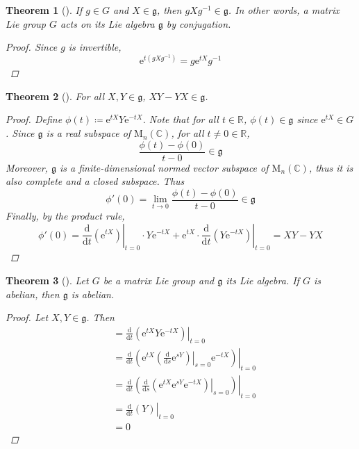 \documentclass[letterpaper, 10pt]{article}
\theoremstyle{theostyle}
\newtheorem{theorem}{Theorem}[section]
\newenvironment{thmstyle}[1][]{%
    \begin{theorem}[#1]\leavevmode\vspace{-\baselineskip}\myquote%
    }{\endmyquote\end{theorem}}
\begin{document}
\begin{thmstyle}
    If \(g \in G\) and \(X \in \mathfrak{g}\), then \(gXg^{-1} \in \mathfrak{g}\).
    In other words, a matrix Lie group \(G\) acts on its Lie algebra \(\mathfrak{g}\) by conjugation.

    \begin{proof}
        Since \(g\) is invertible,
        \[\mathrm{e}^{t(gXg^{-1})} = g \mathrm{e}^{tX} g^{-1}\]
    \end{proof}
\end{thmstyle}

\begin{thmstyle}
    For all \(X, Y \in \mathfrak{g}\), \(XY - YX \in \mathfrak{g}\).

    \begin{proof}
        Define \(\phi(t) \coloneqq \mathrm{e}^{tX} Y \mathrm{e}^{-tX}\).
        Note that for all \(t \in \mathbb{R}\), \(\phi(t) \in \mathfrak{g}\) since \(\mathrm{e}^{tX} \in G\).
        Since \(\mathfrak{g}\) is a real subspace of \(\mathrm{M}_n(\mathbb{C})\), for all \(t \neq 0 \in \mathbb{R}\),
        \[\frac{\phi(t) - \phi(0)}{t - 0} \in \mathfrak{g}\]
        Moreover, \(\mathfrak{g}\) is a finite-dimensional normed vector subspace of \(\mathrm{M}_n(\mathbb{C})\), thus it is also complete and a closed subspace.
        Thus 
        \[\phi'(0) = \lim_{t \to 0} \frac{\phi(t) - \phi(0)}{t - 0} \in \mathfrak{g} \]
        Finally, by the product rule,
        \[\phi'(0) = \left.\frac{\mathrm{d}}{\mathrm{d}t}\left(\mathrm{e}^{tX}\right)\right\vert_{t = 0} \cdot  Y\mathrm{e}^{-tX} + \mathrm{e}^{tX} \cdot \left. \frac{\mathrm{d}}{\mathrm{d}t} \left(Y\mathrm{e}^{-tX}\right)\right\vert_{t = 0} = XY - YX\]
    \end{proof}
\end{thmstyle}

\begin{thmstyle}
    Let \(G\) be a matrix Lie group and \(\mathfrak{g}\) its Lie algebra.
    If \(G\) is abelian, then \(\mathfrak{g}\) is abelian.
    \begin{proof}
        Let \(X,Y \in \mathfrak{g}\).
        Then
        \begin{align*}
            [X,Y] &= \left.\frac{\mathrm{d}}{\mathrm{d}t} \left(\mathrm{e}^{tX}Y\mathrm{e}^{-tX}\right)\right\vert_{t=0} \\
            &= \left.\frac{\mathrm{d}}{\mathrm{d}t} \left(\mathrm{e}^{tX} \left.\left( \frac{\mathrm{d}}{\mathrm{d}s} \mathrm{e}^{sY}\right)\right\vert_{s=0} \mathrm{e}^{-tX} \right)\right\vert_{t=0} \\
            &= \left.\frac{\mathrm{d}}{\mathrm{d}t} \left(\left.\frac{\mathrm{d}}{\mathrm{d}s} \left(\mathrm{e}^{tX}\mathrm{e}^{sY}\mathrm{e}^{-tX}\right)\right\vert_{s=0}\right)\right\rvert_{t=0} \\
            &= \left.\frac{\mathrm{d}}{\mathrm{d}t} \left(Y \right)\right\rvert_{t=0} \\
            &=0
        \end{align*}
    \end{proof}
\end{thmstyle}
\end{document}
